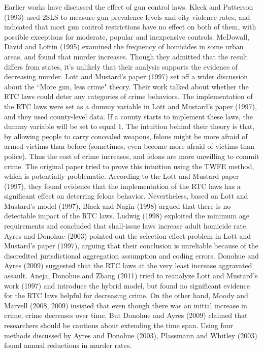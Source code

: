 \documentclass{article}
\begin{document}


Earlier works have discussed the effect of gun control laws. Kleck and Patterson (1993) used 2SLS to measure gun prevalence levels and city violence rates, and indicated that most gun control restrictions have no effect on both of them, with possible exceptions for moderate, popular and inexpensive controls. McDowall, David and Loftin (1995) examined the frequency of homicides in some urban areas, and found that murder increases. Though they admitted that the result differs from states, it's unlikely that their analysis supports the evidence of decreasing murder. Lott and Mustard's paper (1997) set off a wider discussion about the ``More gun, less crime" theory. Their work talked about whether the RTC laws could deter any categories of crime behaviors. The implementation of the RTC laws were set as a dummy variable in Lott and Mustard's paper (1997), and they used county-level data. If a county starts to implement these laws, the dummy variable will be set to equal 1. The intuition behind their theory is that, by allowing people to carry concealed weapons, felons might be more afraid of armed victims than before (sometimes, even become more afraid of victims than police). Thus the cost of crime increases, and felons are more unwilling to commit crime. The original paper tried to prove this intuition using the TWFE method, which is potentially problematic. According to the Lott and Mustard paper (1997), they found evidence that the implementation of the RTC laws has a significant effect on deterring felons behavior. Nevertheless, based on Lott and Mustard's model (1997), Black and Nagin (1998) argued that there is no detectable impact of the RTC laws. Ludwig (1998) exploited the minimum age requirements and concluded that shall-issue laws increase adult homicide rate. Ayres and Donohue (2003) pointed out the selection effect problem in Lott and Mustard's paper (1997), arguing that their conclusion is unreliable because of the discredited jurisdictional aggregation assumption and coding errors. Donohue and Ayres (2009) suggested that the RTC laws at the very least increase aggravated assault. Aneja, Donohue and Zhang (2011) tried to reanalyze Lott and Mustard's work (1997) and introduce the hybrid model, but found no significant evidence for the RTC laws helpful for decreasing crime. On the other hand, Moody and Marvell (2008, 2009) insisted that even though there was an initial increase in crime, crime decreases over time. But Donohue and Ayres (2009) claimed that researchers should be cautious about extending the time span. Using four methods discussed by Ayres and Donohue (2003), Plassmann and Whitley (2003) found annual reductions in murder rates.
\end{document}
